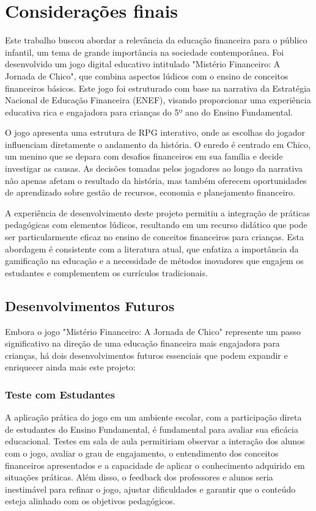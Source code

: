 \chapter{Considerações finais}

Este trabalho buscou abordar a relevância da educação financeira para o público infantil, um tema de grande importância na sociedade contemporânea. Foi desenvolvido um jogo digital educativo intitulado "Mistério Financeiro: A Jornada de Chico", que combina aspectos lúdicos com o ensino de conceitos financeiros básicos. Este jogo foi estruturado com base na narrativa da Estratégia Nacional de Educação Financeira (ENEF), visando proporcionar uma experiência educativa rica e engajadora para crianças do 5º ano do Ensino Fundamental.

O jogo apresenta uma estrutura de RPG interativo, onde as escolhas do jogador influenciam diretamente o andamento da história. O enredo é centrado em Chico, um menino que se depara com desafios financeiros em sua família e decide investigar as causas. As decisões tomadas pelos jogadores ao longo da narrativa não apenas afetam o resultado da história, mas também oferecem oportunidades de aprendizado sobre gestão de recursos, economia e planejamento financeiro.

A experiência de desenvolvimento deste projeto permitiu a integração de práticas pedagógicas com elementos lúdicos, resultando em um recurso didático que pode ser particularmente eficaz no ensino de conceitos financeiros para crianças. Esta abordagem é consistente com a literatura atual, que enfatiza a importância da gamificação na educação e a necessidade de métodos inovadores que engajem os estudantes e complementem os currículos tradicionais.

\section{Desenvolvimentos Futuros}
Embora o jogo "Mistério Financeiro: A Jornada de Chico" represente um passo significativo na direção de uma educação financeira mais engajadora para crianças, há dois desenvolvimentos futuros essenciais que podem expandir e enriquecer ainda mais este projeto:

\subsection{Teste com Estudantes}
A aplicação prática do jogo em um ambiente escolar, com a participação direta de estudantes do Ensino Fundamental, é fundamental para avaliar sua eficácia educacional. Testes em sala de aula permitiriam observar a interação dos alunos com o jogo, avaliar o grau de engajamento, o entendimento dos conceitos financeiros apresentados e a capacidade de aplicar o conhecimento adquirido em situações práticas. Além disso, o feedback dos professores e alunos seria inestimável para refinar o jogo, ajustar dificuldades e garantir que o conteúdo esteja alinhado com os objetivos pedagógicos.

